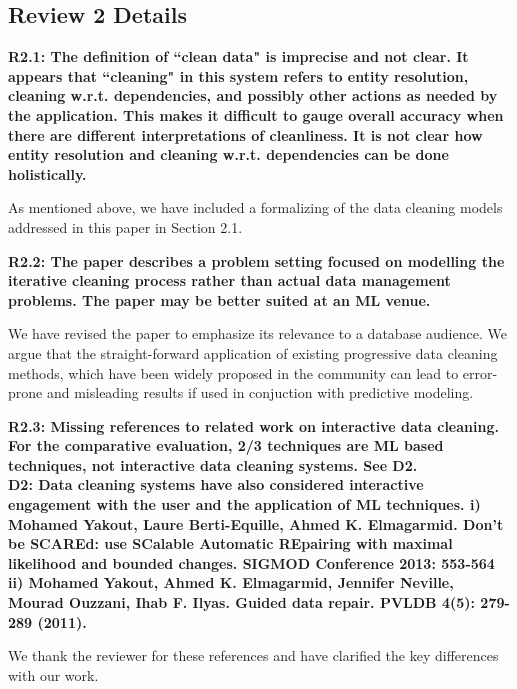 \subsection*{Review 2 Details}

\noindent\textbf{R2.1: The definition of ``clean data" is imprecise and not clear. It appears that ``cleaning" in this system refers to entity resolution, cleaning w.r.t. dependencies, and possibly other actions as needed by the application. This makes it difficult to gauge overall accuracy when there are different interpretations of cleanliness. It is not clear how entity resolution and cleaning w.r.t. dependencies can be done holistically.}

As mentioned above, we have included a formalizing of the data cleaning models addressed in this paper in Section 2.1. 

\vspace{0.5em}

\noindent\textbf{R2.2: The paper describes a problem setting focused on modelling the iterative cleaning process rather than actual data management problems. The paper may be better suited at an ML venue.}

We have revised the paper to emphasize its relevance to a database audience. We argue that the straight-forward application of existing progressive data cleaning methods, which have been widely proposed in the community can lead to error-prone and misleading results if used in conjuction with predictive modeling. 

\vspace{0.5em}

\noindent\textbf{R2.3: Missing references to related work on interactive data cleaning. For the comparative evaluation, 2/3 techniques are ML based techniques, not interactive data cleaning systems. See D2.\\
D2: Data cleaning systems have also considered interactive engagement with the user and the application of ML techniques. 
i) Mohamed Yakout, Laure Berti-Equille, Ahmed K. Elmagarmid. Don't be SCAREd: use SCalable Automatic REpairing with maximal likelihood and bounded changes. SIGMOD Conference 2013: 553-564
ii) Mohamed Yakout, Ahmed K. Elmagarmid, Jennifer Neville, Mourad Ouzzani, Ihab F. Ilyas.
Guided data repair. PVLDB 4(5): 279-289 (2011).
}

We thank the reviewer for these references and have clarified the key differences with our work.

\vspace{0.5em}

